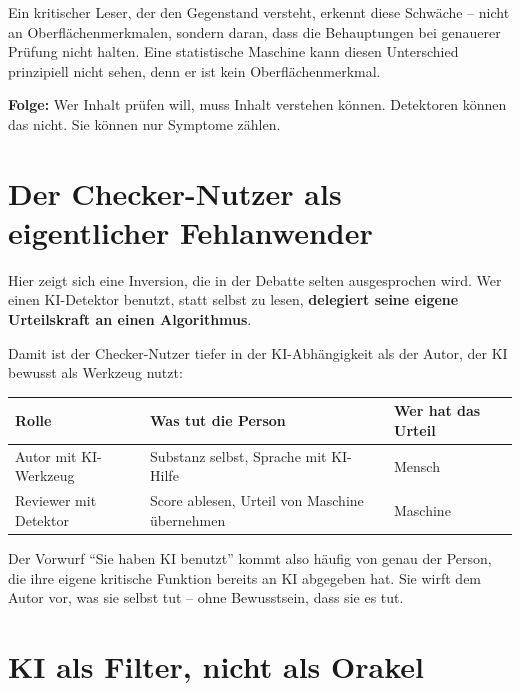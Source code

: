 Ein kritischer Leser, der den Gegenstand versteht, erkennt diese
Schwäche -- nicht an Oberflächenmerkmalen, sondern daran, dass die
Behauptungen bei genauerer Prüfung nicht halten. Eine statistische
Maschine kann diesen Unterschied prinzipiell nicht sehen, denn er
ist kein Oberflächenmerkmal.

\textbf{Folge:} Wer Inhalt prüfen will, muss Inhalt verstehen
können. Detektoren können das nicht. Sie können nur Symptome
zählen.

\section{Der Checker-Nutzer als eigentlicher Fehlanwender}

Hier zeigt sich eine Inversion, die in der Debatte selten ausgesprochen
wird. Wer einen KI-Detektor benutzt, statt selbst zu lesen,
\textbf{delegiert seine eigene Urteilskraft an einen Algorithmus}.

Damit ist der Checker-Nutzer tiefer in der KI-Abhängigkeit als der
Autor, der KI bewusst als Werkzeug nutzt:

\begin{center}
\renewcommand{\arraystretch}{1.4}
{\small
\begin{tabular}{>{\raggedright\arraybackslash}p{3.4cm}>{\raggedright\arraybackslash}p{3.6cm}>{\raggedright\arraybackslash}p{3.4cm}}
\toprule
\textbf{Rolle} & \textbf{Was tut die Person} & \textbf{Wer hat das Urteil} \\
\midrule
Autor mit KI-Werkzeug & Substanz selbst, Sprache mit KI-Hilfe & Mensch \\[3pt]
Reviewer mit Detektor & Score ablesen, Urteil von Maschine übernehmen & Maschine \\
\bottomrule
\end{tabular}
}
\renewcommand{\arraystretch}{1.0}
\end{center}

Der Vorwurf \enquote{Sie haben KI benutzt} kommt also häufig von
genau der Person, die ihre eigene kritische Funktion bereits an KI
abgegeben hat. Sie wirft dem Autor vor, was sie selbst tut -- ohne
Bewusstsein, dass sie es tut.

\section{KI als Filter, nicht als Orakel}

